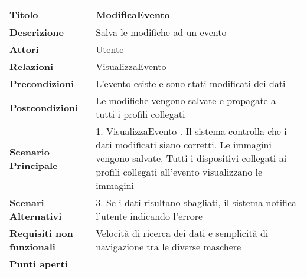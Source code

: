 \begin{tabular} {|P{4.5cm}|P{12.5cm}|}
  \hline
  \textbf{Titolo}                   & ModificaEvento                                                                    \\
  \hline
  \textbf{Descrizione}              & Salva le modifiche ad un evento                                                   \\
  \hline
  \textbf{Attori}                   & Utente                                                                            \\
  \hline
  \textbf{Relazioni}                & VisualizzaEvento                                                                  \\
  \hline
  \textbf{Precondizioni}            & L'evento esiste e sono stati modificati dei dati                                  \\
  \hline
  \textbf{Postcondizioni}           & Le modifiche vengono salvate e propagate a tutti i profili collegati              \\
  \hline
  \textbf{Scenario Principale}      & 1. VisualizzaEvento . Il sistema controlla che i dati modificati siano corretti. Le immagini vengono salvate. Tutti i dispositivi collegati ai profili collegati all'evento visualizzano le immagini                             \\
  \textbf{Scenari Alternativi}      & 3. Se i dati risultano sbagliati, il sistema notifica l'utente indicando l'errore \\
  \hline
  \textbf{Requisiti non funzionali} & Velocità di ricerca dei dati e semplicità di navigazione tra le diverse maschere  \\
  \hline
  \textbf{Punti aperti}             &                                                                                   \\
  \hline
\end{tabular}
\hfill
\break

